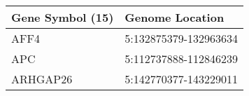 \begin{tabular}{ll}
\toprule
Gene Symbol (15) &       Genome Location \\
\midrule
            AFF4 & 5:132875379-132963634 \\
             APC & 5:112737888-112846239 \\
        ARHGAP26 & 5:142770377-143229011 \\
\bottomrule
\end{tabular}
